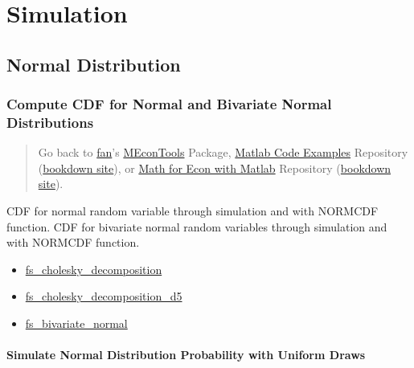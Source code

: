 \documentclass[
]{book}
\begin{document}
\hypertarget{simulation}{%
\chapter{Simulation}\label{simulation}}

\hypertarget{normal-distribution}{%
\section{Normal Distribution}\label{normal-distribution}}

\hypertarget{compute-cdf-for-normal-and-bivariate-normal-distributions}{%
\subsection{Compute CDF for Normal and Bivariate Normal Distributions}\label{compute-cdf-for-normal-and-bivariate-normal-distributions}}

\begin{quote}
Go back to \href{http://fanwangecon.github.io/}{fan}'s \href{https://fanwangecon.github.io/MEconTools/}{MEconTools} Package, \href{https://fanwangecon.github.io/M4Econ/}{Matlab Code Examples} Repository (\href{https://fanwangecon.github.io/M4Econ/bookdown}{bookdown site}), or \href{https://fanwangecon.github.io/Math4Econ/}{Math for Econ with Matlab} Repository (\href{https://fanwangecon.github.io/Math4Econ/bookdown}{bookdown site}).
\end{quote}

CDF for normal random variable through simulation and with NORMCDF
function. CDF for bivariate normal random variables through simulation
and with NORMCDF function.

\begin{itemize}
\item
  \href{https://fanwangecon.github.io/M4Econ/simulation/normal/htmlpdfm/fs_cholesky_decomposition.html}{fs\_cholesky\_decomposition}
\item
  \href{https://fanwangecon.github.io/M4Econ/simulation/normal/htmlpdfm/fs_cholesky_decomposition_d5.html}{fs\_cholesky\_decomposition\_d5}
\item
  \href{https://fanwangecon.github.io/M4Econ/simulation/normal/htmlpdfm/fs_bivariate_normal.html}{fs\_bivariate\_normal}
\end{itemize}

\hypertarget{simulate-normal-distribution-probability-with-uniform-draws}{%
\subsubsection{Simulate Normal Distribution Probability with Uniform Draws}\label{simulate-normal-distribution-probability-with-uniform-draws}}
\end{document}
